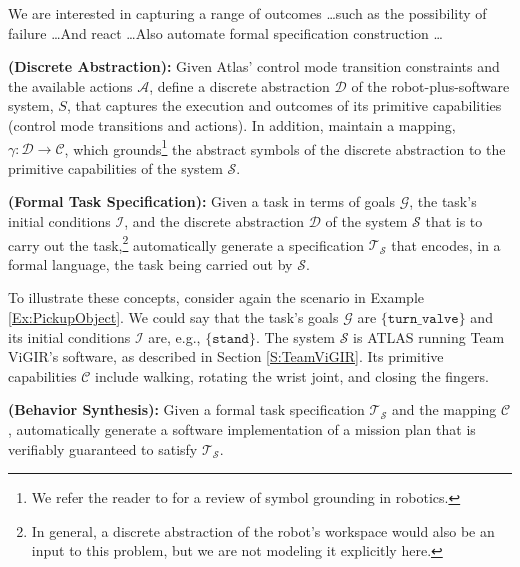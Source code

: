 
We are interested in capturing a range of outcomes \ldots such as the possibility of failure \ldots And react \ldots Also automate formal specification construction \ldots

\begin{myProblem}\label{DiscreteAbstractionProblem}
\textbf{(Discrete Abstraction):}
Given Atlas' control mode transition constraints and the available actions $\mathcal{A}$, define a discrete abstraction $\mathcal{D}$ of the robot-plus-software system, $S$, that captures the execution and outcomes of its primitive capabilities (control mode transitions and actions).
In addition, maintain a mapping, $\gamma: \mathcal{D} \rightarrow \mathcal{C}$, which grounds\footnote{We refer the reader to \cite{Grounding2013} for a review of symbol grounding in robotics.}
 the abstract symbols of the discrete abstraction to the primitive capabilities of the system $\mathcal{S}$.
\end{myProblem}

\begin{myProblem}\label{SpecificationProblem}
\textbf{(Formal Task Specification):}
Given a task in terms of goals $\mathcal{G}$, the task's initial conditions $\mathcal{I}$, and the discrete abstraction $\mathcal{D}$ of the system $\mathcal{S}$ that is to carry out the task,\footnote{In general, a discrete abstraction of the robot's workspace would also be an input to this problem, but we are not modeling it explicitly here.}
 automatically generate a specification $\mathcal{T}_\mathcal{S}$ that encodes, in a formal language, the task being carried out by $\mathcal{S}$.
\end{myProblem}

To illustrate these concepts, consider again the scenario in Example \ref{Ex:PickupObject}. 
We could say that the task's goals $\mathcal{G}$ are $\{ \mathtt{turn\_valve} \}$ and its initial conditions $\mathcal{I}$ are, e.g., $\{ \mathtt{stand} \}$.
The system $\mathcal{S}$ is ATLAS running Team ViGIR's software, as described in Section \ref{S:TeamViGIR}.
Its primitive capabilities $\mathcal{C}$ include walking, rotating the wrist joint, and closing the fingers.

\begin{myProblem}\label{BehaviorSynthesisProblem}
\textbf{(Behavior Synthesis):}
Given a formal task specification $\mathcal{T}_\mathcal{S}$ and the mapping $\mathcal{C}$, automatically generate a software implementation of a mission plan that is verifiably guaranteed to satisfy $\mathcal{T}_\mathcal{S}$.
\end{myProblem}

